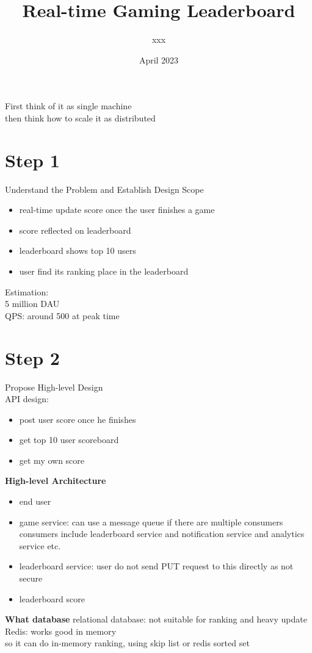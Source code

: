 \documentclass{article}
\title{Real-time Gaming Leaderboard}
\author{xxx}
\date{April 2023}
\begin{document}
\maketitle
First think of it as single machine\\
then think how to scale it as distributed\\
\section{Step 1}
Understand the Problem and Establish Design Scope\\
\begin{itemize}
    \item real-time update score once the user finishes a game
    \item score reflected on leaderboard
    \item leaderboard shows top 10 users
    \item user find its ranking place in the leaderboard
\end{itemize}
Estimation:\\
5 million DAU\\
QPS: around 500 at peak time\\
\section{Step 2}
Propose High-level Design\\
API design:\\
\begin{itemize}
    \item post user score once he finishes
    \item get top 10 user scoreboard
    \item get my own score
\end{itemize}
\textbf{High-level Architecture}
\begin{itemize}
    \item end user
    \item game service: can use a message queue if there are multiple consumers\\
    consumers include leaderboard service and notification service and analytics service etc.\\
    \item leaderboard service: user do not send PUT request to this directly as not secure
    \item leaderboard score
\end{itemize}
\textbf{What database}
relational database: not suitable for ranking and heavy update\\
Redis: works good in memory\\
so it can do in-memory ranking, using skip list or redis sorted set\\
\end{document}

